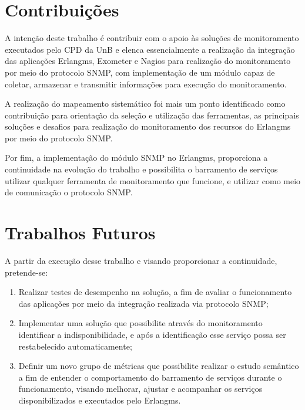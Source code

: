 \section{Contribuições}

A intenção deste trabalho é contribuir com o apoio às soluções de monitoramento executados pelo \acrshort{CPD} da \acrshort{UnB} e elenca essencialmente a realização da integração das aplicações Erlangms, Exometer e Nagios\textsuperscript{\textregistered} para realização do monitoramento por meio do protocolo \acrshort{SNMP}, com implementação de um módulo capaz de coletar, armazenar e transmitir informações para execução do monitoramento.

A realização do mapeamento sistemático foi mais um ponto identificado como contribuição para orientação da seleção e utilização das ferramentas, as principais soluções e desafios para realização do monitoramento dos recursos do Erlangms por meio do protocolo \acrshort{SNMP}.

Por fim, a implementação do módulo \acrshort{SNMP} no Erlangms, proporciona a continuidade na evolução do trabalho \cite{Agilar} e possibilita o barramento de serviços utilizar qualquer ferramenta de monitoramento que funcione, e utilizar como meio de comunicação o protocolo \acrshort{SNMP}.


\section{Trabalhos Futuros}

A partir da execução desse trabalho e visando proporcionar a continuidade, pretende-se:

\begin{enumerate}
    \item Realizar testes de desempenho na solução, a fim de avaliar o funcionamento das aplicações por meio da integração realizada via protocolo \acrshort{SNMP};
    \item Implementar uma solução que possibilite através do monitoramento identificar a indisponibilidade, e após a identificação esse serviço possa ser restabelecido automaticamente;
    \item Definir um novo grupo de métricas que possibilite realizar o estudo semântico a fim de entender o comportamento do barramento de serviços durante o funcionamento, visando melhorar, ajustar e acompanhar os serviços disponibilizados e executados pelo Erlangms.
\end{enumerate}

